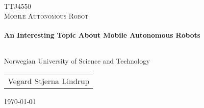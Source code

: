 \begin{titlepage}
{\vspace*{3cm}}
\begin{center}

\textsc{\large TTJ4550} \\ [1cm]
\textsc{\Large Mobile Autonomous Robot} \\ [0.5cm]

\HRule \\[0.5cm]
{ \huge \bfseries  An Interesting Topic About Mobile Autonomous Robots } \\[0.2cm]
\HRule \\[0.5cm]
{\vspace*{0.3cm}}
\begin{large}
    Norwegian University of Science and Technology \\
\end{large}
{\vspace*{4cm}}

{\em
    \begin{tabular}{c}
    Vegard Stjerna Lindrup  \\
    \end{tabular}
}



\vfill
{\small \today}
\end{center}
\end{titlepage}